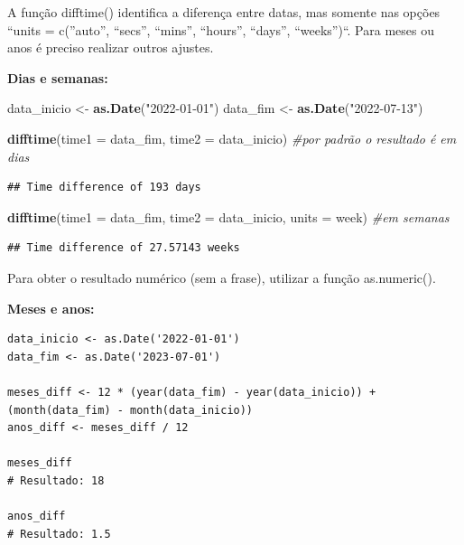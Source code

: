 \documentclass[
]{book}
\newenvironment{Shaded}{\begin{snugshade}}{\end{snugshade}}
\newcommand{\AttributeTok}[1]{\textcolor[rgb]{0.13,0.29,0.53}{#1}}
\newcommand{\CommentTok}[1]{\textcolor[rgb]{0.56,0.35,0.01}{\textit{#1}}}
\newcommand{\FunctionTok}[1]{\textcolor[rgb]{0.13,0.29,0.53}{\textbf{#1}}}
\newcommand{\NormalTok}[1]{#1}
\newcommand{\OtherTok}[1]{\textcolor[rgb]{0.56,0.35,0.01}{#1}}
\newcommand{\StringTok}[1]{\textcolor[rgb]{0.31,0.60,0.02}{#1}}
\theoremstyle{definition}
\theoremstyle{definition}
\theoremstyle{definition}
\theoremstyle{definition}
\theoremstyle{remark}
\begin{document}
A função difftime() identifica a diferença entre datas, mas somente nas opções ``units = c(''auto'', ``secs'', ``mins'', ``hours'', ``days'', ``weeks'')``. Para meses ou anos é preciso realizar outros ajustes.

\textbf{Dias e semanas:}

\begin{Shaded}
\begin{Highlighting}[]
\NormalTok{data\_inicio }\OtherTok{\textless{}{-}} \FunctionTok{as.Date}\NormalTok{(}\StringTok{"2022{-}01{-}01"}\NormalTok{)}
\NormalTok{data\_fim }\OtherTok{\textless{}{-}} \FunctionTok{as.Date}\NormalTok{(}\StringTok{"2022{-}07{-}13"}\NormalTok{)}

\FunctionTok{difftime}\NormalTok{(}\AttributeTok{time1 =}\NormalTok{ data\_fim, }\AttributeTok{time2 =}\NormalTok{ data\_inicio) }\CommentTok{\#por padrão o resultado é em dias}
\end{Highlighting}
\end{Shaded}

\begin{verbatim}
## Time difference of 193 days
\end{verbatim}

\begin{Shaded}
\begin{Highlighting}[]
\FunctionTok{difftime}\NormalTok{(}\AttributeTok{time1 =}\NormalTok{ data\_fim, }\AttributeTok{time2 =}\NormalTok{ data\_inicio, }\AttributeTok{units =} \StringTok{\textquotesingle{}week\textquotesingle{}}\NormalTok{) }\CommentTok{\#em semanas}
\end{Highlighting}
\end{Shaded}

\begin{verbatim}
## Time difference of 27.57143 weeks
\end{verbatim}

Para obter o resultado numérico (sem a frase), utilizar a função as.numeric().

\textbf{Meses e anos:}

\begin{verbatim}
data_inicio <- as.Date('2022-01-01')
data_fim <- as.Date('2023-07-01')

meses_diff <- 12 * (year(data_fim) - year(data_inicio)) + (month(data_fim) - month(data_inicio))
anos_diff <- meses_diff / 12

meses_diff
# Resultado: 18

anos_diff
# Resultado: 1.5
\end{verbatim}
\end{document}
